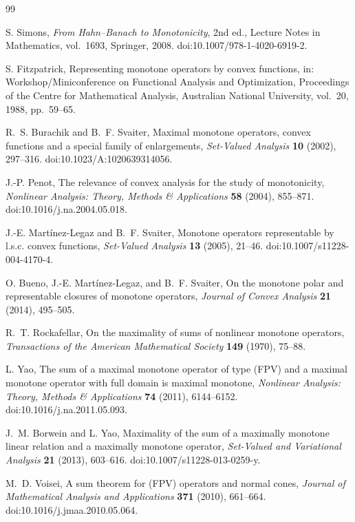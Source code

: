 \begin{thebibliography}{99}
\raggedright
{}
S. Simons,
\emph{From Hahn--Banach to Monotonicity}, 2nd ed.,
Lecture Notes in Mathematics, vol.~1693, Springer, 2008.
doi:10.1007/978-1-4020-6919-2.

S. Fitzpatrick,
Representing monotone operators by convex functions,
in: Workshop/Miniconference on Functional Analysis and Optimization,
Proceedings of the Centre for Mathematical Analysis, Australian National
University, vol.~20, 1988, pp.~59--65.

R.~S. Burachik and B.~F. Svaiter,
Maximal monotone operators, convex functions and a special family of enlargements,
\emph{Set-Valued Analysis} \textbf{10} (2002), 297--316.
doi:10.1023/A:1020639314056.

J.-P. Penot,
The relevance of convex analysis for the study of monotonicity,
\emph{Nonlinear Analysis: Theory, Methods \& Applications}
\textbf{58} (2004), 855--871.
doi:10.1016/j.na.2004.05.018.

J.-E. Mart\'{i}nez-Legaz and B.~F. Svaiter,
Monotone operators representable by l.s.c. convex functions,
\emph{Set-Valued Analysis} \textbf{13} (2005), 21--46.
doi:10.1007/s11228-004-4170-4.

O. Bueno, J.-E. Mart\'{i}nez-Legaz, and B.~F. Svaiter,
On the monotone polar and representable closures of monotone operators,
\emph{Journal of Convex Analysis} \textbf{21} (2014), 495--505.

R.~T. Rockafellar,
On the maximality of sums of nonlinear monotone operators,
\emph{Transactions of the American Mathematical Society}
\textbf{149} (1970), 75--88.

L. Yao,
The sum of a maximal monotone operator of type (FPV) and a maximal
monotone operator with full domain is maximal monotone,
\emph{Nonlinear Analysis: Theory, Methods \& Applications}
\textbf{74} (2011), 6144--6152.
doi:10.1016/j.na.2011.05.093.

J.~M. Borwein and L. Yao,
Maximality of the sum of a maximally monotone linear relation and a
maximally monotone operator,
\emph{Set-Valued and Variational Analysis} \textbf{21} (2013), 603--616.
doi:10.1007/s11228-013-0259-y.

M.~D. Voisei,
A sum theorem for (FPV) operators and normal cones,
\emph{Journal of Mathematical Analysis and Applications}
\textbf{371} (2010), 661--664.
doi:10.1016/j.jmaa.2010.05.064.


\end{thebibliography}
